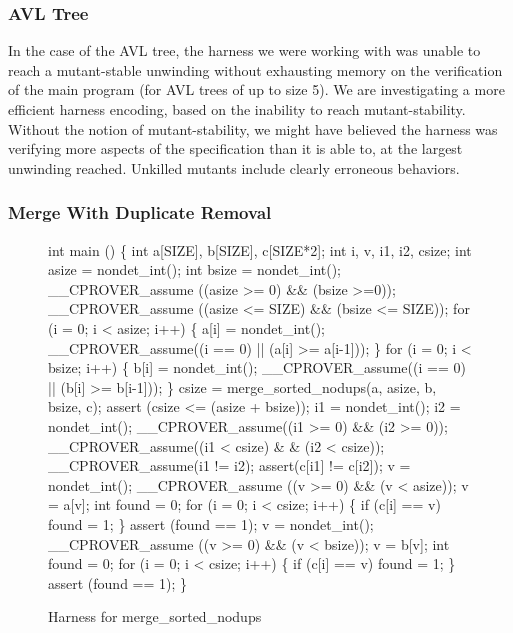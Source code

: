 \documentclass{svjour3}
\begin{document}
\subsubsection{AVL Tree}

In the case of the AVL tree, the harness we were working with
was unable to reach a mutant-stable unwinding without exhausting
memory on the verification of the main program (for AVL trees of up to
size 5).  We are investigating a more efficient harness encoding,
based on the inability to reach mutant-stability.  Without the notion
of mutant-stability, we might have believed the harness was verifying
more aspects of the specification than it is able to, at the largest
unwinding reached.  Unkilled mutants include clearly erroneous behaviors.


\subsubsection{Merge With Duplicate Removal}
\begin{figure}
{%
\begin{code}
int main () \{
  int a[SIZE], b[SIZE], c[SIZE*2];
  int i, v, i1, i2, csize;
  int asize = nondet\_int();
  int bsize = nondet\_int();
  \_\_CPROVER\_assume ((asize >= 0) \&\& (bsize >=0));
  \_\_CPROVER\_assume ((asize <= SIZE) \&\& (bsize <= SIZE));
  for (i = 0; i < asize; i++) \{
    a[i] = nondet\_int();
    \_\_CPROVER\_assume((i == 0) || (a[i] >= a[i-1]));
  \}
  for (i = 0; i < bsize; i++) \{
    b[i] = nondet\_int();
    \_\_CPROVER\_assume((i == 0) || (b[i] >= b[i-1]));
  \}
  csize = merge\_sorted\_nodups(a, asize, b, bsize, c);
  assert (csize <= (asize + bsize));
  i1 = nondet\_int();
  i2 = nondet\_int();
  \_\_CPROVER\_assume((i1 >= 0) \&\& (i2 >= 0));
  \_\_CPROVER\_assume((i1 < csize) \& \& (i2 < csize));
  \_\_CPROVER\_assume(i1 != i2);
  assert(c[i1] != c[i2]);
  v = nondet\_int();
  \_\_CPROVER\_assume ((v >= 0) \&\& (v < asize));
  v = a[v];
  int found = 0;
  for (i = 0; i < csize; i++) \{
    if (c[i] == v)
      found = 1;
  \}
  assert (found == 1);
  v = nondet\_int();
  \_\_CPROVER\_assume ((v >= 0) \&\& (v < bsize));
  v = b[v];
  int found = 0;
  for (i = 0; i < csize; i++) \{
    if (c[i] == v)
      found = 1;
  \}
  assert (found == 1);
\}
\end{code}
}
\caption{Harness for merge\_sorted\_nodups}
\label{fig:mergeharness}
\end{figure}
\end{document}
